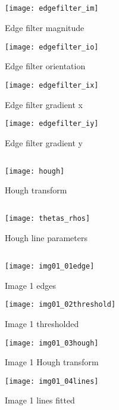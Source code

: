 \documentclass[12pt]{article}
\begin{document}
\subsection{}
\begin{figure}[H] \centering \texttt{[image: edgefilter\_im]}
\caption{Edge filter magnitude}    \end{figure}   
\begin{figure}[H] \centering \texttt{[image: edgefilter\_io]}
\caption{Edge filter orientation}    \end{figure}   
\begin{figure}[H] \centering \texttt{[image: edgefilter\_ix]}
\caption{Edge filter gradient x}    \end{figure}   
\begin{figure}[H] \centering \texttt{[image: edgefilter\_iy]}
\caption{Edge filter gradient y}    \end{figure}   


\newpage
\subsection{}
\begin{figure}[H] \centering \texttt{[image: hough]}
\caption{Hough transform}    \end{figure}   


\newpage
\subsection{}
\begin{figure}[H] \centering \texttt{[image: thetas\_rhos]}
\caption{Hough line parameters}    \end{figure}   


\newpage
\subsection{}
\begin{figure}[H] \centering \texttt{[image: img01\_01edge]}
\caption{Image 1 edges}    \end{figure}   
\begin{figure}[H] \centering \texttt{[image: img01\_02threshold]}
\caption{Image 1 thresholded}    \end{figure}   
\begin{figure}[H] \centering \texttt{[image: img01\_03hough]}
\caption{Image 1 Hough transform}    \end{figure}   
\begin{figure}[H] \centering \texttt{[image: img01\_04lines]}
\caption{Image 1 lines fitted}    \end{figure}   
\end{document}
